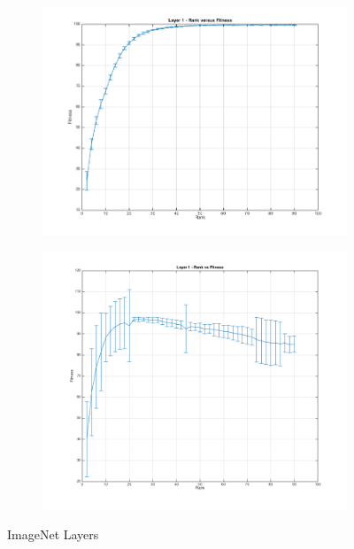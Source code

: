 \documentclass{article} %
\begin{document}
\begin{figure}[h]
  \centering
  \begin{subfigure}[b]{0.40\textwidth}
   \includegraphics[width=\textwidth]{images/Layer1ImageNet.png}
    \caption{}
  \end{subfigure}
  \begin{subfigure}[b]{0.40\textwidth}
    \includegraphics[width=\textwidth]{images/Layer2ImageNet.png}
    \caption{}
  \end{subfigure}
  \caption{ImageNet Layers}
  \label{fig:user_stribution}
\end{figure}
\end{document}
